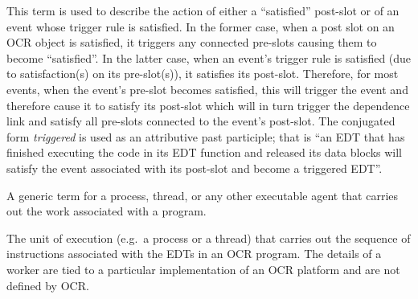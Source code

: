 \glossarydefstart
This term is used to describe the action of either a ``satisfied''
post-slot or of an event whose trigger rule is satisfied. In the
former case, when a post slot on
an OCR object is satisfied, it triggers any connected
pre-slots causing them to become ``satisfied''. In the latter case,
when an event's trigger rule is satisfied (due to satisfaction(s) on its
pre-slot(s)), it satisfies its post-slot. Therefore, for most events,
when the event's pre-slot becomes satisfied, this will trigger the event and
therefore cause it to satisfy its post-slot which will in turn trigger
the dependence link and satisfy all pre-slots connected to the event's
post-slot. The conjugated form \emph{triggered} is used as an
attributive past participle; that is
``an EDT that has finished executing the code in its EDT function and
released its data blocks will satisfy the event associated
with its post-slot and become a triggered EDT''.
\glossarydefend


\glossarydefstart
A generic term for a process, thread, or any other executable agent
that carries out the work associated with a program.
\glossarydefend



\glossarydefstart
The unit of execution (e.g.\ a process or a thread) that carries out
the sequence of instructions associated with the EDTs in an OCR
program. The details of a worker are tied to a particular
implementation of an OCR platform and are not defined by OCR.
\glossarydefend

